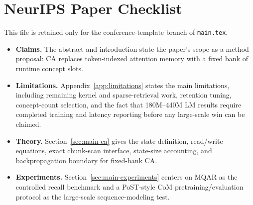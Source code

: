 \section*{NeurIPS Paper Checklist}

This file is retained only for the conference-template branch of \texttt{main.tex}.

\begin{itemize}
\item {\bf Claims.} The abstract and introduction state the paper's scope as a method proposal: CA replaces token-indexed attention memory with a fixed bank of runtime concept slots.
\item {\bf Limitations.} Appendix~\ref{app:limitations} states the main limitations, including remaining kernel and sparse-retrieval work, retention tuning, concept-count selection, and the fact that 180M--440M LM results require completed training and latency reporting before any large-scale win can be claimed.
\item {\bf Theory.} Section~\ref{sec:main-ca} gives the state definition, read/write equations, exact chunk-scan interface, state-size accounting, and backpropagation boundary for fixed-bank CA.
\item {\bf Experiments.} Section~\ref{sec:main-experiments} centers on MQAR as the controlled recall benchmark and a PoST-style CoM pretraining/evaluation protocol as the large-scale sequence-modeling test.
\end{itemize}
